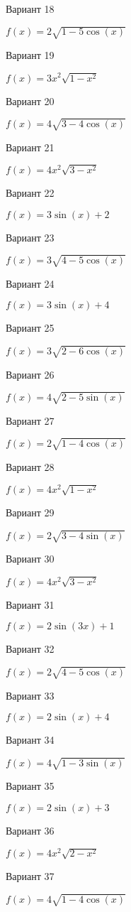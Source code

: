 \documentclass[11pt]{report}
\begin{document}
Вариант 18

$f(x) = 2 \sqrt{1 - 5 \cos{\left(x \right)}}$

Вариант 19

$f(x) = 3 x^{2} \sqrt{1 - x^{2}}$

Вариант 20

$f(x) = 4 \sqrt{3 - 4 \cos{\left(x \right)}}$

Вариант 21

$f(x) = 4 x^{2} \sqrt{3 - x^{2}}$

Вариант 22

$f(x) = 3 \sin{\left(x \right)} + 2$

Вариант 23

$f(x) = 3 \sqrt{4 - 5 \cos{\left(x \right)}}$

Вариант 24

$f(x) = 3 \sin{\left(x \right)} + 4$

Вариант 25

$f(x) = 3 \sqrt{2 - 6 \cos{\left(x \right)}}$

Вариант 26

$f(x) = 4 \sqrt{2 - 5 \sin{\left(x \right)}}$

Вариант 27

$f(x) = 2 \sqrt{1 - 4 \cos{\left(x \right)}}$

Вариант 28

$f(x) = 4 x^{2} \sqrt{1 - x^{2}}$

Вариант 29

$f(x) = 2 \sqrt{3 - 4 \sin{\left(x \right)}}$

Вариант 30

$f(x) = 4 x^{2} \sqrt{3 - x^{2}}$

Вариант 31

$f(x) = 2 \sin{\left(3 x \right)} + 1$

Вариант 32

$f(x) = 2 \sqrt{4 - 5 \cos{\left(x \right)}}$

Вариант 33

$f(x) = 2 \sin{\left(x \right)} + 4$

Вариант 34

$f(x) = 4 \sqrt{1 - 3 \sin{\left(x \right)}}$

Вариант 35

$f(x) = 2 \sin{\left(x \right)} + 3$

Вариант 36

$f(x) = 4 x^{2} \sqrt{2 - x^{2}}$

Вариант 37

$f(x) = 4 \sqrt{1 - 4 \cos{\left(x \right)}}$
\end{document}
